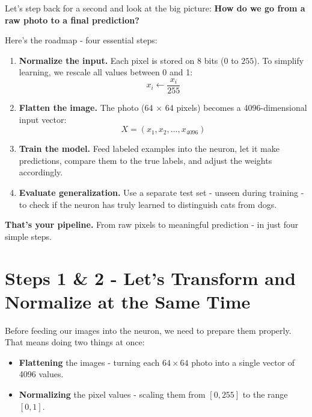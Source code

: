 \documentclass[11pt]{article}
\begin{document}
Let's step back for a second and look at the big picture:  
\textbf{How do we go from a raw photo to a final prediction?}

Here's the roadmap - four essential steps:

\vspace{0.5em}

\begin{enumerate}
    \item \textbf{Normalize the input.}  
    Each pixel is stored on 8 bits ($0$ to $255$).  
    To simplify learning, we rescale all values between 0 and 1:
    \[
    x_i \leftarrow \frac{x_i}{255}
    \]

    \item \textbf{Flatten the image.}  
    The photo (64 × 64 pixels) becomes a 4096-dimensional input vector:
    \[
    X = (x_1, x_2, \dots, x_{4096})
    \]

    \item \textbf{Train the model.}  
    Feed labeled examples into the neuron,
    let it make predictions, compare them to the true labels,
    and adjust the weights accordingly.

    \item \textbf{Evaluate generalization.}  
    Use a separate test set - unseen during training -  
    to check if the neuron has truly learned to distinguish cats from dogs.
\end{enumerate}

\vspace{1em}

\begin{tcolorbox}[colback=white!98!gray, colframe=gray!30!black, arc=1mm]
    \textbf{That's your pipeline.}  
    From raw pixels to meaningful prediction - in just four simple steps.
\end{tcolorbox}
    

\section*{Steps 1 \& 2 - Let's Transform and Normalize at the Same Time}

\vspace{0.5em}

Before feeding our images into the neuron, we need to prepare them properly.  
That means doing two things at once:

\begin{itemize}
    \item \textbf{Flattening} the images - turning each $64 \times 64$ photo into a single vector of 4096 values.
    \item \textbf{Normalizing} the pixel values - scaling them from $[0, 255]$ to the range $[0, 1]$.
\end{itemize}
\end{document}
